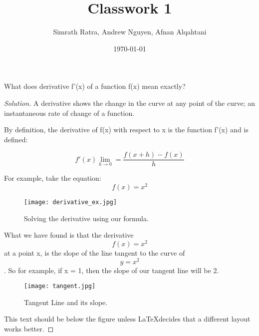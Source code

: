 \documentclass[aps,pra,notitlepage,amsmath,amssymb,letterpaper,12pt]{revtex4-1}
\newenvironment{problem}[2][Problem]{\begin{trivlist}
\item[\hskip \labelsep {\bfseries #1}\hskip \labelsep {\bfseries #2.}]}{\end{trivlist}}
\newenvironment{solution}{\begin{proof}[Solution]}{\end{proof}}
\begin{document}
 
\title{Classwork 1}
\author{Simrath Ratra, Andrew Nguyen, Afnan Alqahtani}
\date{\today}

\maketitle

\begin{problem}{1}
 What does derivative f'(x) of a function f(x) mean exactly?
\end{problem}
 
\begin{solution} %

A derivative shows the change in the curve at any point of the curve; 
an instantaneous rate of change of a function. 

By definition, the derivative of f(x) with respect to x is the function f'(x) and is defined: 

\[ f'(x) \lim_{h \to 0} = \frac{f(x+h)-f(x)}{h} \]



For example, take the equation: 
\[ f(x) = x^2\]


\begin{figure}[h!] %
  \texttt{[image: derivative\_ex.jpg]}  %
  \caption{Solving the derivative using our formula.}
  \label{fig:figlabel}
\end{figure}

What we have found is that the derivative \[ f(x) = x^2\] at a point x, is the slope of the line tangent to the curve of \[ y = x^2\]. So for example, if x = 1, then the slope of our tangent line will be 2. 

\begin{figure}[h!] %
  \texttt{[image: tangent.jpg]} 
  \caption{Tangent Line and its slope.}
  \label{fig:figlabel}
\end{figure}

This text should be below the figure unless \LaTeX decides that a different layout works better.
\end{solution}
 
 
 
\end{document}
